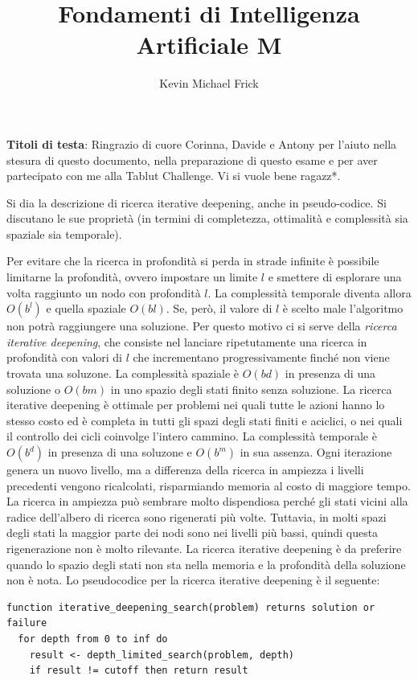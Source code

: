 \documentclass[answers, a4paper, 11pt]{exam}
\title{Fondamenti di Intelligenza Artificiale M}
\author{Kevin Michael Frick}
\begin{document}
\maketitle
\textbf{Titoli di testa}: Ringrazio di cuore Corinna, Davide e Antony per l’aiuto nella stesura di questo documento, nella preparazione di questo esame e per aver partecipato con me alla Tablut Challenge. Vi si vuole bene ragazz*.
\begin{questions}
\question Si dia la descrizione di ricerca iterative deepening, anche in pseudo-codice. Si discutano le sue
proprietà (in termini di completezza, ottimalità e complessità sia spaziale sia temporale).
	\begin{solution}
		Per evitare che la ricerca in profondità si perda in strade infinite è possibile limitarne la profondità, ovvero impostare un limite $l$ e smettere di esplorare una volta raggiunto un nodo con profondità $l$.
		La complessità temporale diventa allora $O(b^l)$ e quella spaziale $O(bl)$. 
		Se, però, il valore di $l$ è scelto male l'algoritmo non potrà raggiungere una soluzione. 
		Per questo motivo ci si serve della \emph{ricerca iterative deepening}, che consiste nel lanciare ripetutamente una ricerca in profondità con valori di $l$ che incrementano progressivamente finché non viene trovata una soluzone. 
		La complessità spaziale è $O(bd)$ in presenza di una soluzione o $O(bm)$ in uno spazio degli stati finito senza soluzione. 
		La ricerca iterative deepening è ottimale per problemi nei quali tutte le azioni hanno lo stesso costo ed è completa in tutti gli spazi degli stati finiti e aciclici, o nei quali il controllo dei cicli coinvolge l'intero cammino. 
		La complessità temporale è $O(b^d)$ in presenza di una soluzone e $O(b^m)$ in sua assenza. 
		Ogni iterazione genera un nuovo livello, ma a differenza della ricerca in ampiezza i livelli precedenti vengono ricalcolati, risparmiando memoria al costo di maggiore tempo. 
		La ricerca in ampiezza può sembrare molto dispendiosa perché gli stati vicini alla radice dell'albero di ricerca sono rigenerati più volte. 
		Tuttavia, in molti spazi degli stati la maggior parte dei nodi sono nei livelli più bassi, quindi questa rigenerazione non è molto rilevante. 
		La ricerca iterative deepening è da preferire quando lo spazio degli stati non sta nella memoria e la profondità della soluzione non è nota. 
	Lo pseudocodice per la ricerca iterative deepening è il seguente:
\begin{verbatim}
function iterative_deepening_search(problem) returns solution or failure
  for depth from 0 to inf do
    result <- depth_limited_search(problem, depth)
    if result != cutoff then return result


\end{verbatim}
\end{solution}
\end{questions}
\end{document}
